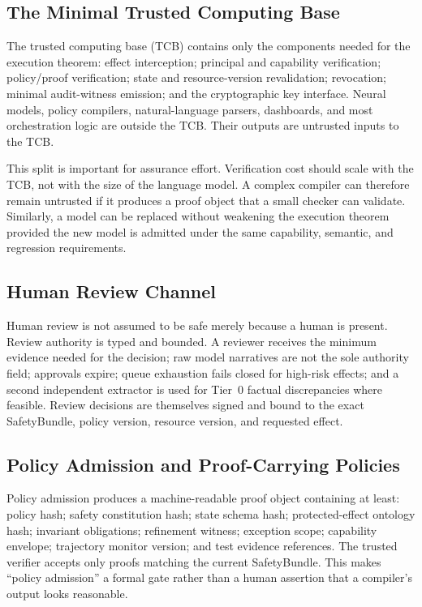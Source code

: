 \documentclass[11pt]{article}
\newcommand{\SafetyBundle}{\textsf{SafetyBundle}}
\begin{document}
\subsection{The Minimal Trusted Computing Base}
The trusted computing base (TCB) contains only the components needed for the execution theorem: effect interception; principal and capability verification; policy/proof verification; state and resource-version revalidation; revocation; minimal audit-witness emission; and the cryptographic key interface. Neural models, policy compilers, natural-language parsers, dashboards, and most orchestration logic are outside the TCB. Their outputs are untrusted inputs to the TCB.

This split is important for assurance effort. Verification cost should scale with the TCB, not with the size of the language model. A complex compiler can therefore remain untrusted if it produces a proof object that a small checker can validate. Similarly, a model can be replaced without weakening the execution theorem provided the new model is admitted under the same capability, semantic, and regression requirements.

\subsection{Human Review Channel}
Human review is not assumed to be safe merely because a human is present. Review authority is typed and bounded. A reviewer receives the minimum evidence needed for the decision; raw model narratives are not the sole authority field; approvals expire; queue exhaustion fails closed for high-risk effects; and a second independent extractor is used for Tier~0 factual discrepancies where feasible. Review decisions are themselves signed and bound to the exact \SafetyBundle{}, policy version, resource version, and requested effect.

\subsection{Policy Admission and Proof-Carrying Policies}
Policy admission produces a machine-readable proof object containing at least: policy hash; safety constitution hash; state schema hash; protected-effect ontology hash; invariant obligations; refinement witness; exception scope; capability envelope; trajectory monitor version; and test evidence references. The trusted verifier accepts only proofs matching the current \SafetyBundle{}. This makes ``policy admission'' a formal gate rather than a human assertion that a compiler's output looks reasonable.
\end{document}
